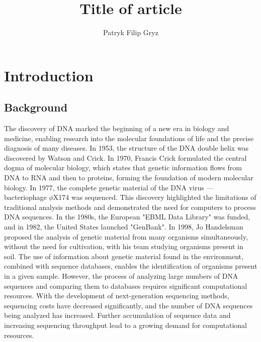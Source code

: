 \documentclass{article}
\begin{document}
    \renewcommand*\l@figure{\@dottedtocline{1}{0.5em}{2.25em}}
    \newcommand{\listoffigurestoc}{
        \listoffigures
        \addcontentsline{toc}{section}{\listfigurename}
    }

    \renewcommand*\l@table{\@dottedtocline{1}{0.5em}{2.25em}}
    \newcommand{\listoftablestoc}{
        \listoftables
        \addcontentsline{toc}{section}{\listtablename}
    }

    \title{Title of article}
    \author{Patryk Filip Gryz}

    \maketitle

    \clearpage
    \section{Introduction}

        \subsection{Background}

            The discovery of DNA marked the beginning of a new era in biology and medicine, enabling research into the molecular foundations of life and the precise diagnosis of many diseases\cite{Louie:2000}. In 1953, the structure of the DNA double helix was discovered by Watson and Crick\cite{Watson:1953}. In 1970, Francis Crick formulated the central dogma of molecular biology\cite{Crick:1970}, which states that genetic information flows from DNA to RNA and then to proteins, forming the foundation of modern molecular biology. In 1977, the complete genetic material of the DNA virus — bacteriophage $\phi{}$X174 was sequenced\cite{Sanger:1977:2}. This discovery highlighted the limitations of traditional analysis methods and demonstrated the need for computers to process DNA sequences\cite{Staden:1979}. In the 1980s, the European "EBML Data Library" was funded\cite{Higgins:1992}, and in 1982, the United States launched "GenBank"\cite{Bilofsky:1986}. In 1998, Jo Handelsman proposed the analysis of genetic material from many organisms simultaneously, without the need for cultivation, with his team studying organisms present in soil\cite{Handelsman:1998}. The use of information about genetic material found in the environment, combined with sequence databases, enables the identification of organisms present in a given sample. However, the process of analyzing large numbers of DNA sequences and comparing them to databases requires significant computational resources. With the development of next-generation sequencing methods\cite{Reinartz:2002}, sequencing costs have decreased significantly, and the number of DNA sequences being analyzed has increased\cite{Muir:2016}. Further accumulation of sequence data and increasing sequencing throughput lead to a growing demand for computational resources.
        
\end{document}
